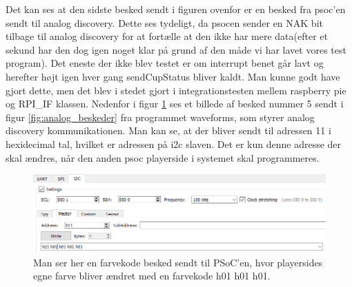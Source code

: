 \documentclass[Modultest/Modultest_main.tex]{subfiles}
\begin{document}
Det kan ses at den sidste besked sendt i figuren ovenfor er en besked fra psoc'en sendt til analog discovery. Dette ses tydeligt, da psocen sender en NAK bit tilbage til analog discovery for at fortælle at den ikke har mere data(efter et sekund har den dog igen noget klar på grund af den måde vi har lavet vores test program). Det eneste der ikke blev testet er om interrupt benet går lavt og herefter højt igen hver gang sendCupStatus bliver kaldt. Man kunne godt have gjort dette, men det blev i stedet gjort i integrationstesten mellem raspberry pie og RPI\_IF klassen. Nedenfor i figur \ref{fig:analog_besked} ses et billede af besked nummer 5 sendt i figur \ref{fig:analog_beskeder} fra programmet waveforms, som styrer analog discovery kommunikationen. Man kan se, at der bliver sendt til adressen 11 i hexidecimal tal, hvilket er adressen på i2c slaven. Det er kun denne adresse der skal ændres, når den anden psoc playerside i systemet skal programmeres.
\begin{figure}
    \centering 
    \includegraphics[width=\linewidth]{Modultest/RPI_IF/graphic/analog_besked.PNG}
    \caption{Man ser her en farvekode besked sendt til PSoC'en, hvor playersides egne farve bliver ændret med en farvekode h01 h01 h01.}
    \label{fig:analog_besked}
\end{figure}
\end{document}
